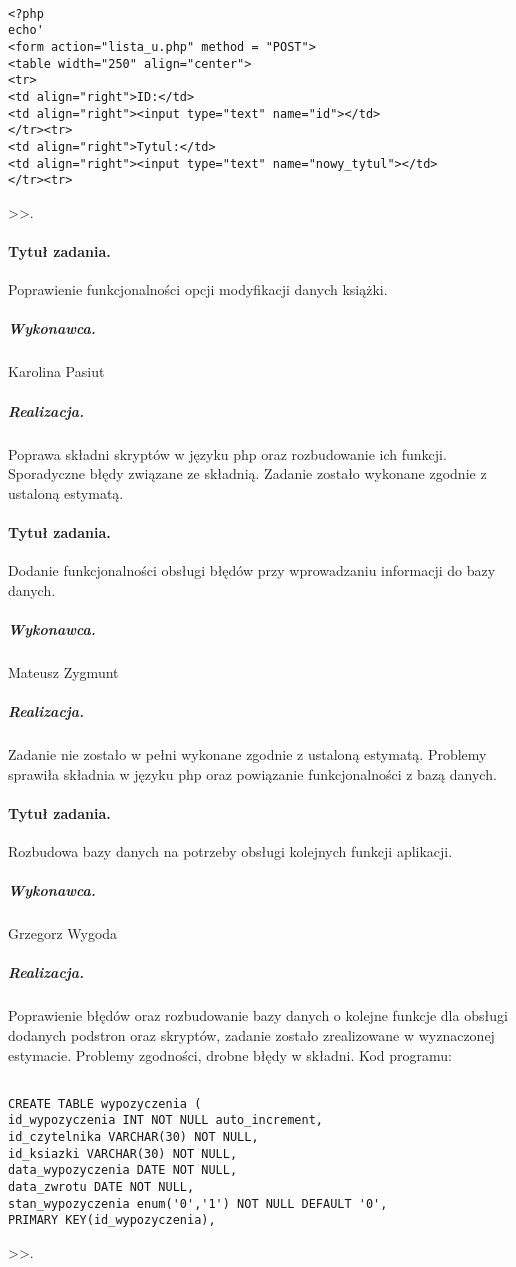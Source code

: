 \documentclass[a4paper]{article}
\begin{document}
\begin{verbatim}

<?php
echo'
<form action="lista_u.php" method = "POST">
<table width="250" align="center">
<tr>
<td align="right">ID:</td>
<td align="right"><input type="text" name="id"></td>
</tr><tr>
<td align="right">Tytul:</td>
<td align="right"><input type="text" name="nowy_tytul"></td>
</tr><tr>

\end{verbatim}>>.

\paragraph{Tytuł zadania.} Poprawienie funkcjonalności opcji modyfikacji danych książki.
\subparagraph{Wykonawca.} Karolina Pasiut
\subparagraph{Realizacja.} Poprawa składni skryptów w języku php oraz rozbudowanie ich funkcji. Sporadyczne błędy związane ze składnią. Zadanie zostało wykonane zgodnie z ustaloną estymatą.


\paragraph{Tytuł zadania.} Dodanie funkcjonalności obsługi błędów przy wprowadzaniu informacji do bazy danych.
\subparagraph{Wykonawca.} Mateusz Zygmunt
\subparagraph{Realizacja.} Zadanie nie zostało w pełni wykonane zgodnie z ustaloną estymatą. Problemy sprawiła składnia w języku php oraz powiązanie funkcjonalności z bazą danych.


\paragraph{Tytuł zadania.}  Rozbudowa bazy danych na potrzeby obsługi kolejnych funkcji aplikacji.
\subparagraph{Wykonawca.} Grzegorz Wygoda
\subparagraph{Realizacja.} Poprawienie błędów oraz rozbudowanie bazy danych o kolejne funkcje dla obsługi dodanych podstron oraz skryptów, zadanie zostało zrealizowane w wyznaczonej estymacie. Problemy zgodności, drobne błędy w składni. Kod programu:

\begin{verbatim}

CREATE TABLE wypozyczenia (
id_wypozyczenia INT NOT NULL auto_increment,
id_czytelnika VARCHAR(30) NOT NULL,
id_ksiazki VARCHAR(30) NOT NULL,
data_wypozyczenia DATE NOT NULL,
data_zwrotu DATE NOT NULL,
stan_wypozyczenia enum('0','1') NOT NULL DEFAULT '0',
PRIMARY KEY(id_wypozyczenia),

\end{verbatim}>>.
\end{document}
